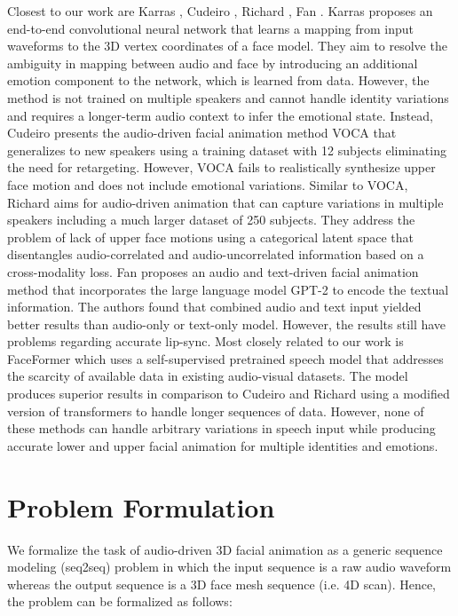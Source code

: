 \documentclass[10pt,twocolumn,letterpaper]{article}
\begin{document}
Closest to our work are Karras \etal\cite{TeroKarras}, Cudeiro \etal \cite{VOCA2019}, Richard \etal\cite{MeshTalk}, Fan \etal\cite{Fan21JA, faceformer2022}. Karras \etal\cite{TeroKarras} proposes an end-to-end convolutional neural network that learns a mapping from input waveforms to the 3D vertex coordinates of a face model. They aim to resolve the ambiguity in mapping between audio and face by introducing an additional emotion component to the network, which is learned from data. However, the method is not trained on multiple speakers and cannot handle identity variations and requires a longer-term audio context to infer the emotional state. Instead, Cudeiro \etal \cite{VOCA2019} presents the audio-driven facial animation method VOCA that generalizes to new speakers using a training dataset with 12 subjects eliminating the need for retargeting. However, VOCA fails to realistically synthesize upper face motion and does not include emotional variations. Similar to VOCA, Richard \etal\cite{MeshTalk} aims for audio-driven animation that can capture variations in multiple speakers including a much larger dataset of 250 subjects. They address the problem of lack of upper face motions using a categorical latent space that disentangles audio-correlated and audio-uncorrelated information based on a cross-modality loss. Fan \etal\cite{Fan21JA} proposes an audio and text-driven facial animation method that incorporates the large language model GPT-2\cite{gpt2} to encode the textual information. The authors found that combined audio and text input yielded better results than audio-only or text-only model. However, the results still have problems regarding accurate lip-sync. Most closely related to our work is FaceFormer\cite{faceformer2022} which uses a self-supervised pretrained speech model that addresses the scarcity of available data in existing audio-visual datasets. The model produces superior results in comparison to Cudeiro \etal \cite{VOCA2019} and Richard \etal\cite{MeshTalk} using a modified version of transformers to handle longer sequences of data. However, none of these methods can handle arbitrary variations in speech input while producing accurate lower and upper facial animation for multiple identities and emotions. 



\section{Problem Formulation}
We formalize the task of audio-driven 3D facial animation as a generic sequence modeling (seq2seq) problem in which the input sequence is a raw audio waveform whereas the output sequence is a 3D face mesh sequence (i.e. 4D scan). Hence, the problem can be formalized as follows:
\end{document}
